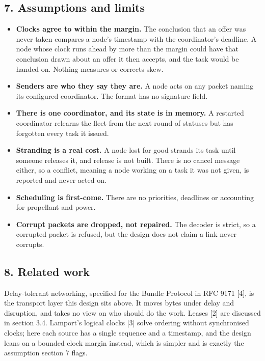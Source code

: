 \documentclass[
  12pt,
  letterpaper,
]{article}
\providecommand{\tightlist}{%
  \setlength{\itemsep}{0pt}\setlength{\parskip}{0pt}}
\begin{document}
\hypertarget{assumptions-and-limits}{%
\subsection{7. Assumptions and limits}\label{assumptions-and-limits}}

\begin{itemize}
\tightlist
\item
  \textbf{Clocks agree to within the margin.} The conclusion that an
  offer was never taken compares a node's timestamp with the
  coordinator's deadline. A node whose clock runs ahead by more than the
  margin could have that conclusion drawn about an offer it then
  accepts, and the task would be handed on. Nothing measures or corrects
  skew.
\item
  \textbf{Senders are who they say they are.} A node acts on any packet
  naming its configured coordinator. The format has no signature field.
\item
  \textbf{There is one coordinator, and its state is in memory.} A
  restarted coordinator relearns the fleet from the next round of
  statuses but has forgotten every task it issued.
\item
  \textbf{Stranding is a real cost.} A node lost for good strands its
  task until someone releases it, and release is not built. There is no
  cancel message either, so a conflict, meaning a node working on a task
  it was not given, is reported and never acted on.
\item
  \textbf{Scheduling is first-come.} There are no priorities, deadlines
  or accounting for propellant and power.
\item
  \textbf{Corrupt packets are dropped, not repaired.} The decoder is
  strict, so a corrupted packet is refused, but the design does not
  claim a link never corrupts.
\end{itemize}

\hypertarget{related-work}{%
\subsection{8. Related work}\label{related-work}}

Delay-tolerant networking, specified for the Bundle Protocol in RFC 9171
{[}4{]}, is the transport layer this design sits above. It moves bytes
under delay and disruption, and takes no view on who should do the work.
Leases {[}2{]} are discussed in section 3.4. Lamport's logical clocks
{[}3{]} solve ordering without synchronised clocks; here each source has
a single sequence and a timestamp, and the design leans on a bounded
clock margin instead, which is simpler and is exactly the assumption
section 7 flags.
\end{document}
